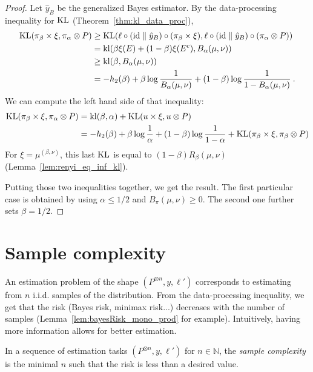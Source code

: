 \begin{proof}%
{}
Let $\hat{y}_B$ be the generalized Bayes estimator. By the data-processing inequality for $\operatorname{KL}$ (Theorem~\ref{thm:kl_data_proc}),
\begin{align*}
\operatorname{KL}(\pi_\beta \times \xi, \pi_\alpha \otimes P)
&\ge \operatorname{KL}(\ell \circ (\mathrm{id} \parallel \hat{y}_B) \circ (\pi_\beta \times \xi), \ell \circ (\mathrm{id} \parallel \hat{y}_B) \circ (\pi_\alpha \otimes P))
\\
&= \operatorname{kl}(\beta \xi(E) + (1 - \beta) \xi(E^c), B_\alpha(\mu, \nu))
\\
&\ge \operatorname{kl}(\beta, B_\alpha(\mu, \nu))
\\
&= - h_2(\beta) + \beta \log\frac{1}{B_\alpha(\mu, \nu)} + (1 - \beta)\log\frac{1}{1 - B_\alpha(\mu, \nu)}
\: .
\end{align*}
We can compute the left hand side of that inequality:
\begin{align*}
\operatorname{KL}(\pi_\beta \times \xi, \pi_\alpha \otimes P)
&= \operatorname{kl}(\beta, \alpha) + \operatorname{KL}(u \times \xi, u \otimes P)
\\
&= - h_2(\beta) + \beta\log\frac{1}{\alpha} + (1 - \beta)\log\frac{1}{1 - \alpha} + \operatorname{KL}(\pi_\beta \times \xi, \pi_\beta \otimes P)
\end{align*}
For $\xi = \mu^{(\beta, \nu)}$, this last $\operatorname{KL}$ is equal to $(1 - \beta) R_{\beta}(\mu, \nu)$ (Lemma~\ref{lem:renyi_eq_inf_kl}).

Putting those two inequalities together, we get the result. The first particular case is obtained by using $\alpha \le 1/2$ and $B_\pi(\mu, \nu) \ge 0$.
The second one further sets $\beta = 1/2$.
\end{proof}



\section{Sample complexity}

An estimation problem of the shape $(P^{\otimes n}, y, \ell')$ corresponds to estimating from $n$ i.i.d. samples of the distribution. From the data-processing inequality, we get that the risk (Bayes risk, minimax risk...) decreases with the number of samples (Lemma~\ref{lem:bayesRisk_mono_prod} for example).
Intuitively, having more information allows for better estimation.

In a sequence of estimation tasks $(P^{\otimes n}, y, \ell')$ for $n \in \mathbb{N}$, the \emph{sample complexity} is the minimal $n$ such that the risk is less than a desired value.

